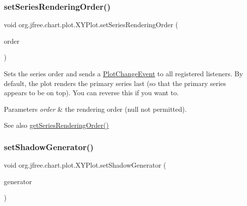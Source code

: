 \subsubsection{\texorpdfstring{set\+Series\+Rendering\+Order()}{setSeriesRenderingOrder()}}
{\footnotesize\ttfamily void org.\+jfree.\+chart.\+plot.\+X\+Y\+Plot.\+set\+Series\+Rendering\+Order (\begin{DoxyParamCaption}\item[{\mbox{\hyperlink{classorg_1_1jfree_1_1chart_1_1plot_1_1_series_rendering_order}{Series\+Rendering\+Order}}}]{order }\end{DoxyParamCaption})}

Sets the series order and sends a \mbox{\hyperlink{}{Plot\+Change\+Event}} to all registered listeners. By default, the plot renders the primary series last (so that the primary series appears to be on top). You can reverse this if you want to.


\begin{DoxyParams}{Parameters}
{\em order} & the rendering order ({\ttfamily null} not permitted).\\
\hline
\end{DoxyParams}
\begin{DoxySeeAlso}{See also}
\mbox{\hyperlink{classorg_1_1jfree_1_1chart_1_1plot_1_1_x_y_plot_a1a743a03a79a8f5c1cc42bb245057e55}{get\+Series\+Rendering\+Order()}} 
\end{DoxySeeAlso}
\mbox{\label{classorg_1_1jfree_1_1chart_1_1plot_1_1_x_y_plot_ad0b70c56e64616d9f4940c278b39e393}} 
\subsubsection{\texorpdfstring{set\+Shadow\+Generator()}{setShadowGenerator()}}
{\footnotesize\ttfamily void org.\+jfree.\+chart.\+plot.\+X\+Y\+Plot.\+set\+Shadow\+Generator (\begin{DoxyParamCaption}\item[{\mbox{\hyperlink{interfaceorg_1_1jfree_1_1chart_1_1util_1_1_shadow_generator}{Shadow\+Generator}}}]{generator }\end{DoxyParamCaption})}

